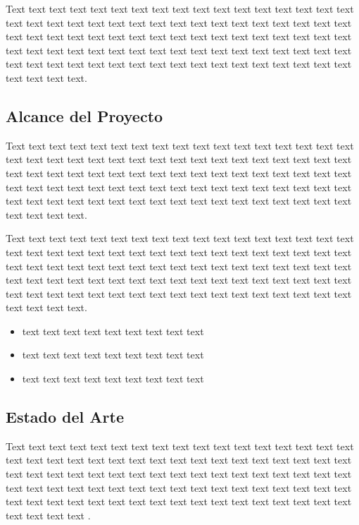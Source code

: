 \documentclass[12pt,a4paper]{article}
\begin{document}
Text text text text text text text text text text text text text text text text text text text text text text text text text text text text text text text text text text text text text text text text text text text text text text text text text text text text text text text text text text text text text text text text text text text text text text text text text text text text text text text text text text text text text text text text text.
\subsection{Alcance del Proyecto}
\label{sec:6}
Text text text text text text text text text text text text text text text text text text text text text text text text text text text text text text text text text text text text text text text text text text text text text text text text text text text text text text text text text text text text text text text text text text text text text text text text text text text text text text text text text text text text text text text text text.

Text text text text text text text text text text text text text text text text text text text text text text text text text text text text text text text text text text text text text text text text text text text text text text text text text text text text text text text text text text text text text text text text text text text text text text text text text text text text text text text text text text text text text text text text text.

\begin{itemize}
  \item text text text text text text text text text
  \item text text text text text text text text text
  \item text text text text text text text text text
\end{itemize}


\subsection{Estado del Arte}
\label{sec:7}
Text text text text text text text text text text text text text text text text text text text text text text text text text text text text text text text text text text text text text text text text text text text text text text text text text text text text text text text text text text text text text text text text text text text text text text text text text text text text text text text text text text text text text text text text text \cite{Inga2021}.
\end{document}
